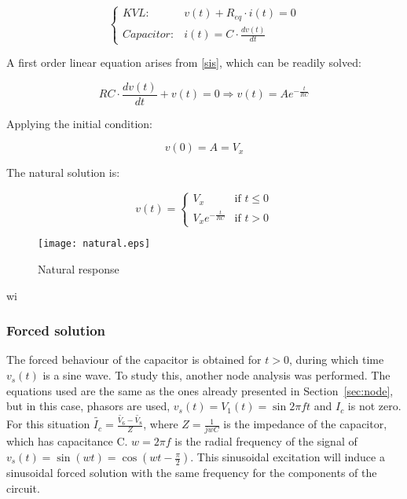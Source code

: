 \begin{equation}
  \begin{cases}
    KVL: & v(t) + R_{eq} \cdot i(t) = 0 \\
    Capacitor: & i(t) = C \cdot \frac{dv(t)}{dt}
  \end{cases}
  \label{sis}
\end{equation}

A first order linear equation arises from \ref{sis}, which can be readily solved:

\begin{equation}
  RC \cdot \frac{dv(t)}{dt} + v(t) = 0 \Rightarrow v(t) = Ae^{-\frac{t}{RC}}
\end{equation}

Applying the initial condition:

\begin{equation}
  v(0) = A = V_x
\end{equation}

The natural solution is:

\begin{equation}
  \label{nat_sol} v(t) =
  \begin{cases}
    V_x & \mbox{if } t \leq 0 \\
    V_xe^{-\frac{t}{RC}} & \mbox{if } t > 0
  \end{cases}
\end{equation}

\begin{figure}[H]
  \centering
  \texttt{[image: natural.eps]}
  \caption{Natural response}
  \label{fig:nat}
\end{figure}wi

\subsubsection{Forced solution}

The forced behaviour of the capacitor is obtained for $t > 0$, during which time $v_s(t)$ is a sine wave. To study this, another node analysis was performed. The equations used are the same as the ones already presented in Section~\ref{sec:node}, but in this case, phasors are used, $v_s(t) = V_1(t) = \sin{2\pi ft}$ and $I_c$ is not zero. For this situation $\widetilde{I_c} = \frac{\widetilde{V_6}-\widetilde{V_8}}{Z}$, where $Z = \frac{1}{jwC}$ is the impedance of the capacitor, which has capacitance C. $w = 2\pi f$ is the radial frequency of the signal of $v_s(t) = \sin(wt) = \cos(wt-\frac{\pi}{2})$. This sinusoidal excitation will induce a sinusoidal forced solution with the same frequency for the components of the circuit.


